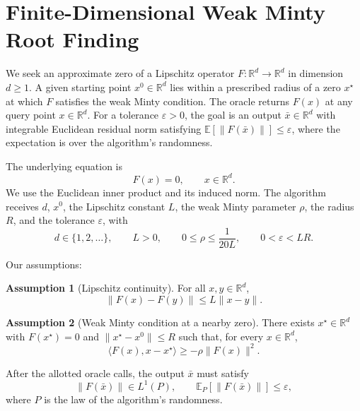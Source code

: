 \documentclass[10pt]{article}
\theoremstyle{definition}
\newtheorem{assumption}{Assumption}
\begin{document}
\section*{Finite-Dimensional Weak Minty Root Finding}
We seek an approximate zero of a Lipschitz operator $F:\mathbb{R}^d\to\mathbb{R}^d$ in dimension $d\geq 1$. A given starting point $x^0\in\mathbb{R}^d$ lies within a prescribed radius of a zero $x^\star$ at which $F$ satisfies the weak Minty condition. The oracle returns $F(x)$ at any query point $x\in\mathbb{R}^d$. For a tolerance $\varepsilon>0$, the goal is an output $\bar{x}\in\mathbb{R}^d$ with integrable Euclidean residual norm satisfying $\mathbb{E}[\|F(\bar{x})\|]\leq\varepsilon$, where the expectation is over the algorithm's randomness.

The underlying equation is
\[
F(x)=0,\qquad x\in\mathbb{R}^d.
\]
We use the Euclidean inner product and its induced norm. The algorithm receives $d$, $x^0$, the Lipschitz constant $L$, the weak Minty parameter $\rho$, the radius $R$, and the tolerance $\varepsilon$, with
\[
d\in\{1,2,\ldots\},\qquad L>0,\qquad
0\leq\rho\leq\frac{1}{20L},\qquad 0<\varepsilon<LR.
\]

Our assumptions:
\begin{assumption}[Lipschitz continuity]
For all $x,y\in\mathbb{R}^d$,
\[
\|F(x)-F(y)\|\leq L\|x-y\|.
\]
\end{assumption}

\begin{assumption}[Weak Minty condition at a nearby zero]
There exists $x^\star\in\mathbb{R}^d$ with $F(x^\star)=0$ and $\|x^\star-x^0\|\leq R$ such that, for every $x\in\mathbb{R}^d$,
\[
\langle F(x),x-x^\star\rangle\geq-\rho\|F(x)\|^2.
\]
\end{assumption}

After the allotted oracle calls, the output $\bar{x}$ must satisfy
\[
\|F(\bar{x})\|\in L^1(P),\qquad
\mathbb{E}_{P}[\|F(\bar{x})\|]\leq\varepsilon,
\]
where $P$ is the law of the algorithm's randomness.
\end{document}
